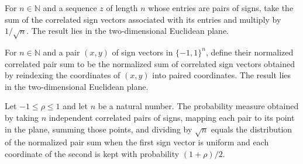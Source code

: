 \begin{definition}
\label{FABL.normalizedCorrelatedSignVectorSum}
\leanok
{}
For $n\in\mathbb N$ and a sequence $z$ of length $n$ whose entries are pairs of signs,
take the sum of the correlated sign vectors associated with its entries and multiply by
$1/\sqrt n$. The result lies in the two-dimensional Euclidean plane.
\end{definition}

\begin{definition}
\label{FABL.normalizedCorrelatedPairSum}
\leanok
{}
For $n\in\mathbb N$ and a pair $(x,y)$ of sign vectors in $\{-1,1\}^n$, define their
normalized correlated pair sum to be the normalized sum of correlated sign vectors
obtained by reindexing the coordinates of $(x,y)$ into paired coordinates. The result
lies in the two-dimensional Euclidean plane.
\end{definition}

\begin{theorem}
\label{FABL.normalizedCorrelatedSignSumMeasure_eq_map_correlatedPairPMF}
\leanok
{}
Let $-1\leq \rho\leq 1$ and let $n$ be a natural number. The probability measure
obtained by taking $n$ independent correlated pairs of signs, mapping each pair to its
point in the plane, summing those points, and dividing by $\sqrt n$ equals the
distribution of the normalized pair sum when the first sign vector is uniform and each
coordinate of the second is kept with probability $(1+\rho)/2$.
\end{theorem}
